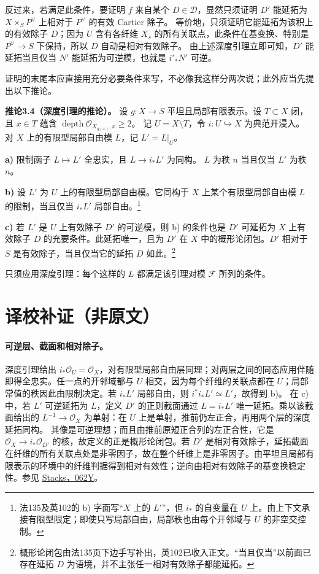 \documentclass[openany,fontset=fandol]{ctexbook}
\DeclareMathOperator{\depth}{depth}
\newcommand{\OO}{\mathcal O}
\newcommand{\FF}{\mathcal F}
\begin{document}
反过来，若满足此条件，要证明 \(f\) 来自某个 \(D\in\mathcal D\)，显然只须证明 \(D'\) 能延拓为 \(X\times_S P^\vee\) 上相对于 \(P^\vee\) 的有效 Cartier 除子。
等价地，只须证明它能延拓为该积上的有效除子 \(D\)；因为 \(U\) 含有各纤维 \(X_s\) 的所有关联点，此条件在基变换、特别是 \(P^\vee\to S\) 下保持，所以 \(D\) 自动是相对有效除子。
由上述深度引理立即可知，\(D'\) 能延拓当且仅当 \(N'\) 能延拓为可逆模，也就是 \(i'_*N'\) 可逆。

证明的末尾本应直接用充分必要条件来写，不必像我这样分两次说；此外应当先提出以下推论。

\medskip\noindent\textbf{推论3.4（深度引理的推论）。}
设 \(g:X\to S\) 平坦且局部有限表示。设 \(T\subset X\) 闭，且
\(x\in T\) 蕴含 \(\depth\OO_{X_{g(x)},x}\ge2\)。
记 \(U=X\setminus T\)，令 \(i:U\hookrightarrow X\) 为典范开浸入。
对 \(X\) 上的有限型局部自由模 \(L\)，记 \(L'=L|_U\)。

\noindent\textbf{a)} 限制函子 \(L\mapsto L'\) 全忠实，且 \(L\to i_*L'\) 为同构。
\(L\) 为秩 \(n\) 当且仅当 \(L'\) 为秩 \(n\)。

\noindent\textbf{b)} 设 \(L'\) 为 \(U\) 上的有限型局部自由模。它同构于 \(X\) 上某个有限型局部自由模 \(L\) 的限制，当且仅当 \(i_*L'\) 局部自由。\footnote{法135及英102的 b) 字面写“\(X\) 上的 \(L'\)”，但 \(i_*\) 的自变量在 \(U\) 上。由上下文承接有限型限定；即使只写局部自由，局部秩也由每个开邻域与 \(U\) 的非空交控制。}

\noindent\textbf{c)} 若 \(L'\) 是 \(U\) 上有效除子 \(D'\) 的可逆模，则 b) 的条件也是 \(D'\) 可延拓为 \(X\) 上有效除子 \(D\) 的充要条件。此延拓唯一，且为 \(D'\) 在 \(X\) 中的概形论闭包。\(D'\) 相对于 \(S\) 是有效除子，当且仅当它的延拓 \(D\) 如此。\footnote{概形论闭包由法135页下边手写补出，英102已收入正文。“当且仅当”以前面已存在延拓 \(D\) 为语境，并不主张任一相对有效除子都能延拓。}

只须应用深度引理：每个这样的 \(L\) 都满足该引理对模 \(\FF\) 所列的条件。

\section*{译校补证（非原文）}
\paragraph{可逆层、截面和相对除子。}
深度引理给出 \(i_*\OO_U=\OO_X\)，对有限型局部自由层同理；对两层之间的同态应用伴随即得全忠实。任一点的开邻域都与 \(U\) 相交，因为每个纤维的关联点都在 \(U\)；局部常值的秩因此由限制决定。若 \(i_*L'\) 局部自由，则 \(i^*i_*L'\simeq L'\)，故得到 b)。
在 c) 中，若 \(L'\) 可逆延拓为 \(L\)，定义 \(D'\) 的正则截面通过 \(L=i_*L'\) 唯一延拓。乘以该截面给出的 \(L^{-1}\to\OO_X\) 为单射：在 \(U\) 上是单射，推前仍左正合，再用两个层的深度延拓同构。
其像是可逆理想；而且由推前原短正合列的左正合性，它是 \(\OO_X\to i_*\OO_{D'}\) 的核，故定义的正是概形论闭包。若 \(D'\) 是相对有效除子，延拓截面在纤维的所有关联点处是非零因子，故在整个纤维上是非零因子。由平坦且局部有限表示的环境中的纤维判据得到相对有效性；逆向由相对有效除子的基变换稳定性。参见 \href{https://stacks.math.columbia.edu/tag/062Y}{Stacks，062Y}。
\end{document}
